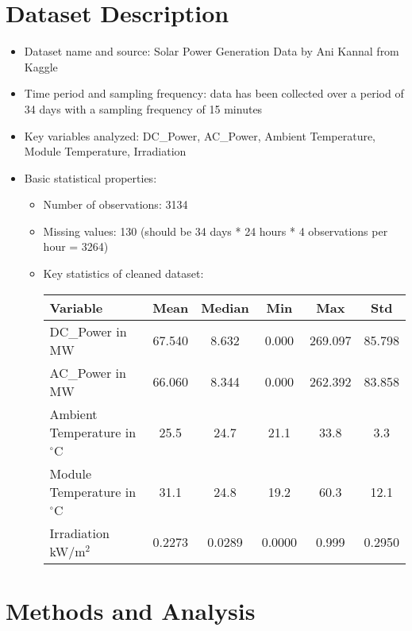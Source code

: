 \documentclass[10pt]{article}
\begin{document}
\section{Dataset Description}
\begin{itemize}
    \item Dataset name and source: Solar Power Generation Data by Ani Kannal from Kaggle
    \item Time period and sampling frequency: data has been collected over a period of 34 days with a sampling frequency of 15 minutes
    \item Key variables analyzed: DC\_Power, AC\_Power, Ambient Temperature, Module Temperature, Irradiation
    \item Basic statistical properties:
    \begin{itemize}
        \item Number of observations: 3134
        \item Missing values: 130 (should be 34 days * 24 hours * 4 observations per hour = 3264)
        \item Key statistics of cleaned dataset: 
            \begin{table}[h!]
            \centering
            \begin{tabular}{lccccc}
            \toprule
            Variable & Mean & Median & Min & Max & Std \\
            \midrule
            DC\_Power in MW & 67.540 & 8.632 & 0.000 & 269.097 & 85.798 \\
            AC\_Power in MW & 66.060 & 8.344 & 0.000 & 262.392 & 83.858 \\
            Ambient Temperature in $^\circ$C & 25.5 & 24.7 & 21.1 & 33.8 & 3.3 \\
            Module Temperature in $^\circ$C & 31.1 & 24.8 & 19.2 & 60.3 & 12.1 \\
            Irradiation kW/m$^2$ & 0.2273 & 0.0289 & 0.0000 & 0.999 & 0.2950 \\
            \bottomrule
            \end{tabular}
            \label{tab:basic_stats}
            \end{table}
    \end{itemize}
\end{itemize}

\section{Methods and Analysis}
\end{document}
